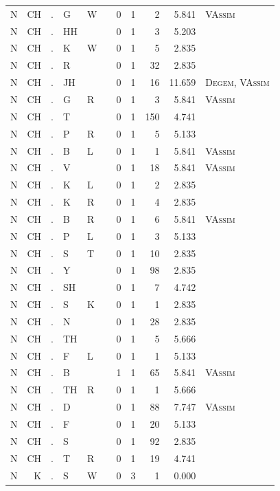 \documentclass[12pt]{article}
\begin{document}
\begin{longtable}{r@{ } r@{ } c@{ } l@{ } l@{ } l@{ } r r r r l }
N & CH & . & G & W &  & 0 & 1 & 2 & 5.841 & \textsc{VAssim} \\
N & CH & . & HH &  &  & 0 & 1 & 3 & 5.203 &  \\
N & CH & . & K & W &  & 0 & 1 & 5 & 2.835 &  \\
N & CH & . & R &  &  & 0 & 1 & 32 & 2.835 &  \\
N & CH & . & JH &  &  & 0 & 1 & 16 & 11.659 & \textsc{Degem}, \textsc{VAssim} \\
N & CH & . & G & R &  & 0 & 1 & 3 & 5.841 & \textsc{VAssim} \\
N & CH & . & T &  &  & 0 & 1 & 150 & 4.741 &  \\
N & CH & . & P & R &  & 0 & 1 & 5 & 5.133 &  \\
N & CH & . & B & L &  & 0 & 1 & 1 & 5.841 & \textsc{VAssim} \\
N & CH & . & V &  &  & 0 & 1 & 18 & 5.841 & \textsc{VAssim} \\
N & CH & . & K & L &  & 0 & 1 & 2 & 2.835 &  \\
N & CH & . & K & R &  & 0 & 1 & 4 & 2.835 &  \\
N & CH & . & B & R &  & 0 & 1 & 6 & 5.841 & \textsc{VAssim} \\
N & CH & . & P & L &  & 0 & 1 & 3 & 5.133 &  \\
N & CH & . & S & T &  & 0 & 1 & 10 & 2.835 &  \\
N & CH & . & Y &  &  & 0 & 1 & 98 & 2.835 &  \\
N & CH & . & SH &  &  & 0 & 1 & 7 & 4.742 &  \\
N & CH & . & S & K &  & 0 & 1 & 1 & 2.835 &  \\
N & CH & . & N &  &  & 0 & 1 & 28 & 2.835 &  \\
N & CH & . & TH &  &  & 0 & 1 & 5 & 5.666 &  \\
N & CH & . & F & L &  & 0 & 1 & 1 & 5.133 &  \\
N & CH & . & B &  &  & 1 & 1 & 65 & 5.841 & \textsc{VAssim} \\
N & CH & . & TH & R &  & 0 & 1 & 1 & 5.666 &  \\
N & CH & . & D &  &  & 0 & 1 & 88 & 7.747 & \textsc{VAssim} \\
N & CH & . & F &  &  & 0 & 1 & 20 & 5.133 &  \\
N & CH & . & S &  &  & 0 & 1 & 92 & 2.835 &  \\
N & CH & . & T & R &  & 0 & 1 & 19 & 4.741 &  \\
N & K & . & S & W &  & 0 & 3 & 1 & 0.000 &  \\

\end{longtable}
\end{document}
